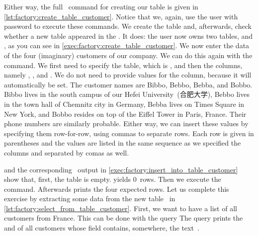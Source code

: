 Either way, the full \sql\ command for creating our table  is given in \cref{lst:factory:create_table_customer}.
Notice that we, again, use the  user with password  to execute these commands.
We create the table and, afterwards, check whether a new table appeared in the .
It does: the user  now owns two tables,  and , as you can see in \cref{exec:factory:create_table_customer}.%
%
\endhsection%
%
%
\label{sec:factory:table:customer:insert}%
%
%
We now enter the data of the four (imaginary) customers of our company.
We can do this again with the  command.
We first need to specify the table, which is , and then the columns, namely , , and .
We do not need to provide values for the  column, because it will automatically be set.
The customer names are Bibbo, Bebbo, Bebba, and Bobbo.
Bibbo lives in the south campus of our Hefei University~(合肥大学), Bebbo lives in the town hall of Chemnitz city in Germany, Bebba lives on Times Square in New York, and Bobbo resides on top of the Eiffel Tower in Paris, France.
Their phone numbers are similarly probable.
Either way, we can insert these values by specifying them row-for-row, using commas to separate rows.
Each row is given in parentheses and the values are listed in the same sequence as we specified the columns and separated by comas as well.

 and the corresponding \psql\ output in \cref{exec:factory:insert_into_table_customer} show that, first, the table is empty.
 yields 0~rows.
Then we execute the  command.
Afterwards  prints the four expected rows.%
\endhsection%
%
%
%
%
Let us complete this exercise by extracting some data from the new table~ in \cref{lst:factory:select_from_table_customer}.
First, we want to have a list of all customers from France.
This can be done with the query 
The query prints the  and  of all customers whose  field contains, somewhere, the text~.

